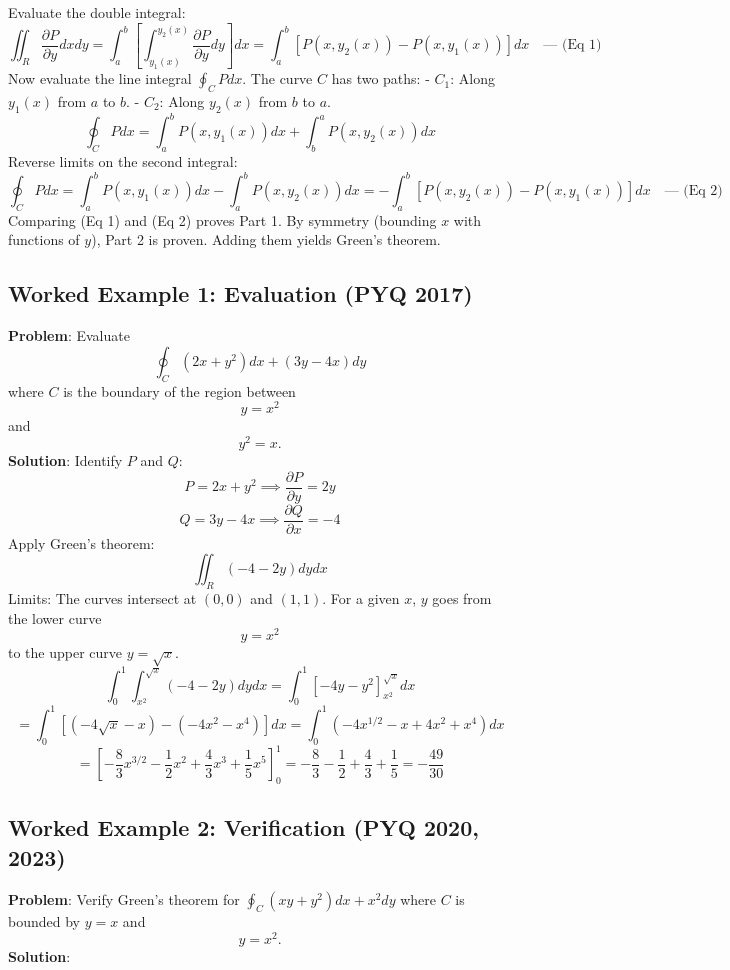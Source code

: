\documentclass[
]{article}
\begin{document}
Evaluate the double integral:
\[
\iint_R \frac{\partial P}{\partial y} dx dy = \int_a^b \left[ \int_{y_1(x)}^{y_2(x)} \frac{\partial P}{\partial y} dy \right] dx = \int_a^b \left[ P(x, y_2(x)) - P(x, y_1(x)) \right] dx \quad \text{--- (Eq 1)}
\]
Now evaluate the line integral \(\oint_C P dx\). The curve \(C\) has two
paths: - \(C_1\): Along \(y_1(x)\) from \(a\) to \(b\). - \(C_2\): Along
\(y_2(x)\) from \(b\) to \(a\).
\[
\oint_C P dx = \int_a^b P(x, y_1(x)) dx + \int_b^a P(x, y_2(x)) dx
\]
Reverse limits on the second integral:
\[
\oint_C P dx = \int_a^b P(x, y_1(x)) dx - \int_a^b P(x, y_2(x)) dx = -\int_a^b \left[ P(x, y_2(x)) - P(x, y_1(x)) \right] dx \quad \text{--- (Eq 2)}
\]
Comparing (Eq 1) and (Eq 2) proves Part 1. By symmetry (bounding \(x\)
with functions of \(y\)), Part 2 is proven. Adding them yields Green's
theorem.

\subsection{Worked Example 1: Evaluation (PYQ
2017)}\label{worked-example-1-evaluation-pyq-2017}

\textbf{Problem}: Evaluate
\[
\oint_C (2x + y^2)dx + (3y - 4x)dy
\]
where \(C\) is the boundary of the region between
\[
y = x^2
\]
and
\[
y^2 = x.
\]
\textbf{Solution}: Identify \(P\) and \(Q\):
\[
P = 2x + y^2 \implies \frac{\partial P}{\partial y} = 2y
\]
\[
Q = 3y - 4x \implies \frac{\partial Q}{\partial x} = -4
\]
Apply Green's theorem:
\[
\iint_R (-4 - 2y) dy dx
\]
Limits: The curves intersect at \((0,0)\) and \((1,1)\). For a given
\(x\), \(y\) goes from the lower curve
\[
y=x^2
\]
to the upper curve \(y=\sqrt{x}\).
\[
\int_0^1 \int_{x^2}^{\sqrt{x}} (-4 - 2y) dy dx = \int_0^1 \left[ -4y - y^2 \right]_{x^2}^{\sqrt{x}} dx
\]
\[
= \int_0^1 \left[ (-4\sqrt{x} - x) - (-4x^2 - x^4) \right] dx = \int_0^1 (-4x^{1/2} - x + 4x^2 + x^4) dx
\]
\[
= \left[ -\frac{8}{3}x^{3/2} - \frac{1}{2}x^2 + \frac{4}{3}x^3 + \frac{1}{5}x^5 \right]_0^1 = -\frac{8}{3} - \frac{1}{2} + \frac{4}{3} + \frac{1}{5} = -\frac{49}{30}
\]

\subsection{Worked Example 2: Verification (PYQ 2020,
2023)}\label{worked-example-2-verification-pyq-2020-2023}

\textbf{Problem}: Verify Green's theorem for
\(\oint_C (xy + y^2)dx + x^2 dy\) where \(C\) is bounded by \(y = x\)
and
\[
y = x^2.
\]
\textbf{Solution}:
\end{document}
